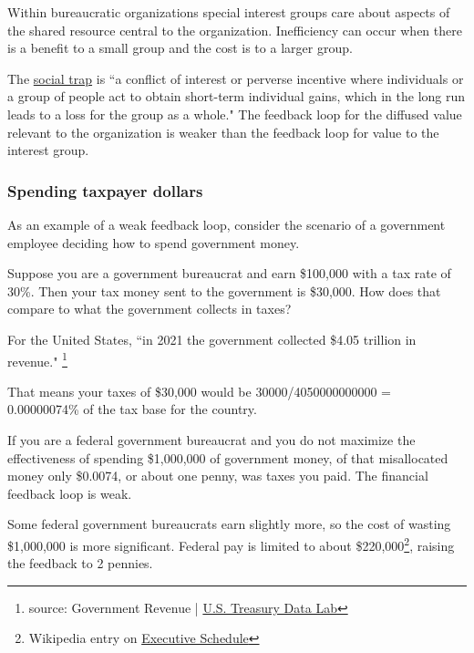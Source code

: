 Within bureaucratic organizations special interest groups care about aspects of the shared resource central to the organization. 
Inefficiency can occur when there is a benefit to a small group and the cost is to a larger group.

The \href{https://en.wikipedia.org/wiki/Social_trap}{social trap}
is ``a conflict of interest or perverse incentive where individuals or a group of people act to obtain short-term individual gains, which in the long run leads to a loss for the group as a whole."
The feedback loop for the diffused value relevant to the organization is weaker than the feedback loop for value to the interest group. 

\subsubsection*{Spending taxpayer dollars}

As an example of a weak feedback loop, consider the scenario of a government employee deciding how to spend government money.

\begin{mdframed}
Suppose you are a government bureaucrat and earn \$100,000 with a tax rate of 30\%. Then your tax money sent to the government is \$30,000.
How does that compare to what the government collects in taxes?

For the United States, ``in 2021 the government collected \$4.05 trillion in revenue."
\footnote{source: Government Revenue | \href{https://datalab.usaspending.gov/americas-finance-guide/revenue/}{U.S. Treasury Data Lab}}

That means your taxes of \$30,000 would be
30000/4050000000000 = 0.00000074\% of the tax base for the country.

If you are a federal government bureaucrat and you do not maximize the effectiveness of spending \$1,000,000 of government money, of that misallocated money only \$0.0074, or about one penny, was taxes you paid. The financial feedback loop is weak.

Some federal government bureaucrats earn slightly more, so the cost of wasting \$1,000,000 is more significant.
Federal pay is limited to about \$220,000\footnote{Wikipedia entry on \href{https://en.wikipedia.org/wiki/Executive\_Schedule}{Executive Schedule}
}, raising the feedback to 2 pennies.
\end{mdframed}

